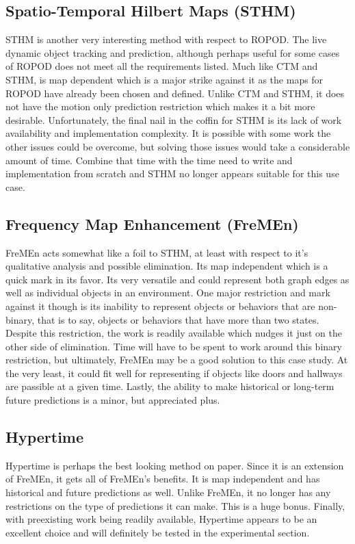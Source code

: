   \subsection{ Spatio-Temporal Hilbert Maps (STHM) }
  STHM is another very interesting method with respect to ROPOD. The live
  dynamic object tracking and prediction, although perhaps useful for some
  cases of ROPOD does not meet all the requirements listed. Much like CTM and
  STHM, is map dependent which is a major strike against it as the maps for
  ROPOD have already been chosen and defined. Unlike CTM and STHM, it does not
  have the motion only prediction restriction which makes it a bit more
  desirable. Unfortunately, the final nail in the coffin for STHM is its lack
  of work availability and implementation complexity. It is possible with some
  work the other issues could be overcome, but solving those issues would take
  a considerable amount of time. Combine that time with the time need to write
  and implementation from scratch and STHM no longer appears suitable for this
  use case.

  \subsection { Frequency Map Enhancement (FreMEn) }
  FreMEn acts somewhat like a foil to STHM, at least with respect to it's
  qualitative analysis and possible elimination. Its map independent which is
  a quick mark in its favor. Its very versatile and could represent both graph
  edges as well as individual objects in an environment. One major restriction
  and mark against it though is its inability to represent objects or behaviors
  that are non-binary, that is to say, objects or behaviors that have more than
  two states. Despite this restriction, the work is readily available which
  nudges it just on the other side of elimination. Time will have to be spent
  to work around this binary restriction, but ultimately, FreMEn may be a good
  solution to this case study. At the very least, it could fit well for
  representing if objects like doors and hallways are passible at a given time.
  Lastly, the ability to make historical or long-term future predictions is
  a minor, but appreciated plus.

  \subsection { Hypertime }
  Hypertime is perhaps the best looking method on paper. Since it is an
  extension of FreMEn, it gets all of FreMEn's benefits. It is map independent
  and has historical and future predictions as well. Unlike FreMEn, it no
  longer has any restrictions on the type of predictions it can make. This is
  a huge bonus. Finally, with preexisting work being readily available, Hypertime
  appears to be an excellent choice and will definitely be tested in the
  experimental section.

